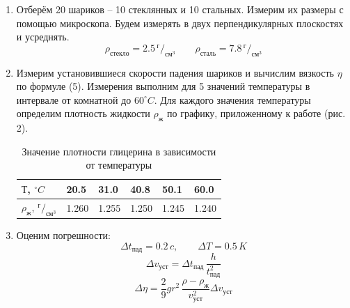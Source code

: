 \documentclass[a4paper,12pt]{article}
\begin{document}
	\begin{enumerate}
		\item Отберём 20 шариков -- 10 стеклянных и 10 стальных. Измерим их размеры с помощью микроскопа. Будем измерять в двух перпендикулярных плоскостях и усреднять. 
		$$\rho_{стекло} = 2.5 \, ^{г}/_{см^3} \qquad \rho_{сталь} = 7.8 \, ^{г}/_{см^3}$$
	
		\item Измерим установившиеся скорости падения шариков и вычислим вязкость $\eta$ по  формуле (5). Измерения выполним для 5 значений температуры в  интервале  от  комнатной до $60^\circ C$. Для каждого значения температуры определим плотность жидкости $\rho_{ж}$ по графику, приложенному к работе (рис. 2).
		\begin{table}[h!] 
			\caption{Значение плотности глицерина в зависимости от температуры}
			\begin{center}
				\begin{tabular}{|*{6}{l|}} \hline
					$Т$, $^\circ C$ & 20.5 & 31.0 & 40.8 & 50.1 & 60.0 \\ \hline
					$\rho_{ж}$, $^г/_{см^3}$ & 1.260 & 1.255 & 1.250 & 1.245 & 1.240 \\ \hline
				\end{tabular}
			\end{center}
		\end{table}
	
		\item Оценим погрешности:
		$$\Delta t_{пад} = 0.2\,c, \qquad \Delta T = 0.5\,K$$
		$$\Delta v_{уст} = \Delta t_{пад} \, \dfrac{h}{t^2_{пад}}$$
		$$\Delta\eta =\dfrac{2}{9}gr^2 \, \dfrac{\rho - \rho_ж}{v^2_{уст}} \Delta v_{уст} $$
	

\end{enumerate}
\end{document}
